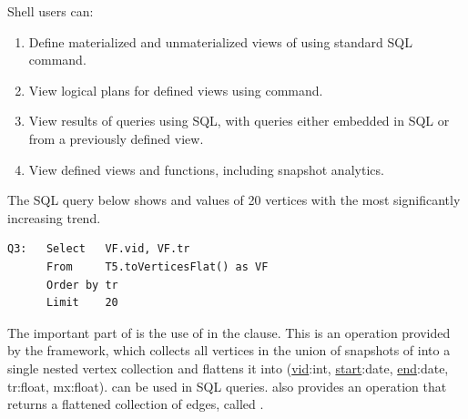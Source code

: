 Shell users can:
\begin{enumerate}[leftmargin=*]
\item Define materialized and unmaterialized views of \tg using
  standard SQL  command.
\item View logical plans for defined views using 
  command.
\item View results of queries using SQL, with \ql queries either
  embedded in SQL or from a previously defined view.
\item View defined views and functions, including snapshot analytics.
\end{enumerate}

The SQL query below shows  and  values of 20
vertices with the most significantly increasing 
trend.

\begin{small}
\begin{verbatim}
Q3:   Select   VF.vid, VF.tr  
      From     T5.toVerticesFlat() as VF
      Order by tr
      Limit    20
\end{verbatim}
\end{small}

The important part of  is the use of
 in the  clause.  This is an
operation provided by the \ql framework, which collects all vertices
in the union of snapshots of  into a single nested vertex
collection and flattens it into  (\underline{vid}:int,
\underline{start}:date, \underline{end}:date, tr:float, mx:float).
 can be used in SQL queries.  \ql also provides an operation
that returns a flattened collection of edges, called
.
